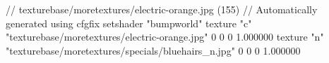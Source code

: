 // texturebase/moretextures/electric-orange.jpg (155)
// Automatically generated using cfgfix
setshader "bumpworld"
texture "c" "texturebase/moretextures/electric-orange.jpg" 0 0 0 1.000000
texture "n" "texturebase/moretextures/specials/bluehairs_n.jpg" 0 0 0 1.000000
